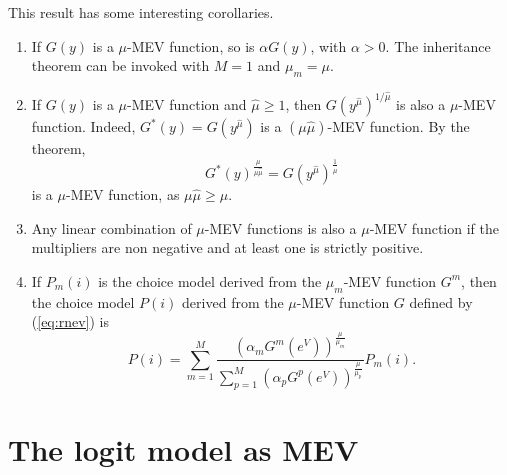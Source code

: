 \documentclass[12pt,a4paper]{article}
\newcommand{\req}[1]{(\ref{#1})}
\begin{document}
\begin{itemize}
This result has some interesting corollaries. 
\begin{enumerate}
\item If $G(y)$ is a $\mu$-MEV function, so is $\alpha G(y)$, with $\alpha > 0$. The inheritance theorem can be invoked with $M=1$ and $\mu_m=\mu$.
\item If  $G(y)$ is a $\mu$-MEV function and $\widehat{\mu} \geq 1$, then $G(y^{\widehat{\mu}})^{1/\widehat{\mu}}$ is also a $\mu$-MEV function. Indeed, $G^*(y)=G(y^{\widehat{\mu}})$ is a $(\mu \widehat{\mu})$-MEV function. By the theorem,
\[
G^*(y)^{\frac{\mu}{\mu \widehat{\mu}}} = G(y^{\widehat{\mu}})^{\frac{1}{\widehat{\mu}}}
\]
is a $\mu$-MEV function, as $\mu \widehat{\mu} \geq \mu$.
\item Any linear combination of $\mu$-MEV functions is also a $\mu$-MEV function if the multipliers are non negative and at least one is strictly positive.
\item If $P_m(i)$ is the choice model derived from the $\mu_m$-MEV function $G^m$, then the choice model $P(i)$ derived from the $\mu$-MEV function $G$ defined by \req{eq:rnev} is
\begin{equation}
\label{eq:probaInheritance}
P(i) = \sum_{m=1}^M \frac{(\alpha_m G^m(e^V))^{\frac{\mu}{\mu_m}}}{\sum_{p=1}^M (\alpha_p G^p(e^V))^{\frac{\mu}{\mu_p}}} P_m(i).
\end{equation}
\end{enumerate}
\end{itemize}

\section{The logit model as  MEV}
\label{sec:9-mevMNL}
\end{document}

